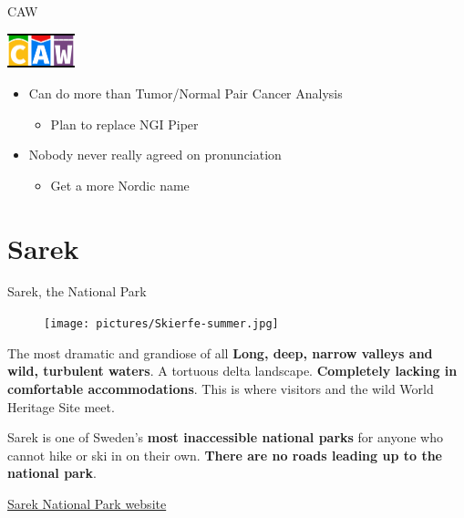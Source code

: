 \documentclass{beamer}
\begin{document}
\begin{frame}{CAW}
	\begin{center}
		\includegraphics[height=1cm]{pictures/CAW}
	\end{center}
	\begin{itemize}
		\item Can do more than Tumor/Normal Pair Cancer Analysis
		\pause
		\begin{itemize}
			\item Plan to replace NGI Piper
		\end{itemize}
		\pause
		\item Nobody never really agreed on pronunciation
		\pause
		\begin{itemize}
			\item Get a more Nordic name
		\end{itemize}
	\end{itemize}
\end{frame}

\section{Sarek}

\begin{frame}{Sarek, the National Park}
	\begin{figure}[t]
		\texttt{[image: pictures/Skierfe-summer.jpg]}
	\end{figure}
\end{frame}

\begin{frame}{The most dramatic and grandiose of all}
		\textbf{Long, deep, narrow valleys and wild, turbulent waters}. A tortuous delta landscape.
		\textbf{Completely lacking in comfortable accommodations}. This is where visitors and the wild World Heritage Site meet.

		Sarek is one of Sweden’s \textbf{most inaccessible national parks} for anyone who cannot hike or ski in on their own. \textbf{There are no roads leading up to the national park}.

		\hfill\href{http://www.nationalparksofsweden.se/choose-park---list/sarek-national-park/national-park-fact/}{Sarek National Park website}
\end{frame}
\end{document}
